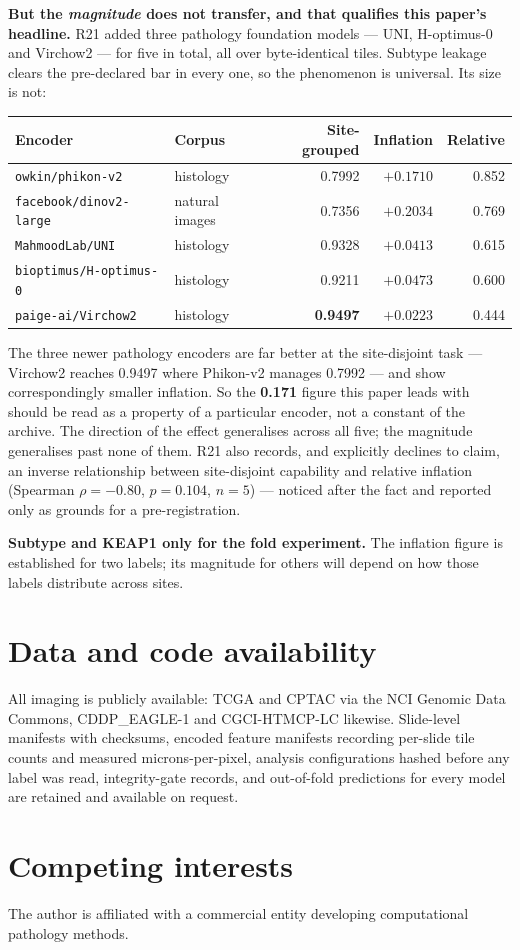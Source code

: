 \documentclass[11pt,a4paper]{article}
\begin{document}
\textbf{But the \emph{magnitude} does not transfer, and that qualifies this paper's headline.}
R21 added three pathology foundation models --- UNI, H-optimus-0 and Virchow2 --- for five in total,
all over byte-identical tiles. Subtype leakage clears the pre-declared bar in every one, so the
phenomenon is universal. Its size is not:

\begin{center}
\small
\begin{tabular}{@{}llrrr@{}}
\toprule
\textbf{Encoder} & \textbf{Corpus} & \textbf{Site-grouped} & \textbf{Inflation} &
\textbf{Relative} \\
\midrule
\texttt{owkin/phikon-v2} & histology & 0.7992 & $+0.1710$ & 0.852 \\
\texttt{facebook/dinov2-large} & natural images & 0.7356 & $+0.2034$ & 0.769 \\
\texttt{MahmoodLab/UNI} & histology & 0.9328 & $+0.0413$ & 0.615 \\
\texttt{bioptimus/H-optimus-0} & histology & 0.9211 & $+0.0473$ & 0.600 \\
\texttt{paige-ai/Virchow2} & histology & \textbf{0.9497} & $+0.0223$ & 0.444 \\
\bottomrule
\end{tabular}
\end{center}

The three newer pathology encoders are far better at the site-disjoint task --- Virchow2 reaches
0.9497 where Phikon-v2 manages 0.7992 --- and show correspondingly smaller inflation. So the
\textbf{0.171} figure this paper leads with should be read as a property of a particular encoder,
not a constant of the archive. The direction of the effect generalises across all five; the
magnitude generalises past none of them. R21 also records, and explicitly declines to claim, an
inverse relationship between site-disjoint capability and relative inflation (Spearman
$\rho = -0.80$, $p = 0.104$, $n = 5$) --- noticed after the fact and reported only as grounds for a
pre-registration.

\textbf{Subtype and KEAP1 only for the fold experiment.} The inflation figure is established for
two labels; its magnitude for others will depend on how those labels distribute across sites.

\section*{Data and code availability}

All imaging is publicly available: TCGA and CPTAC via the NCI Genomic Data Commons,
CDDP\_EAGLE-1 and CGCI-HTMCP-LC likewise. Slide-level manifests with checksums, encoded feature
manifests recording per-slide tile counts and measured microns-per-pixel, analysis
configurations hashed before any label was read, integrity-gate records, and out-of-fold
predictions for every model are retained and available on request.

\section*{Competing interests}

The author is affiliated with a commercial entity developing computational pathology methods.
\end{document}
